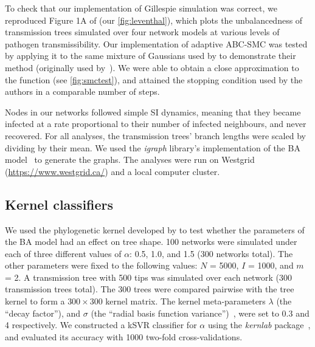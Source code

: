 \documentclass[12pt]{article}\usepackage[]{graphicx}\usepackage[]{color}
\begin{document}
To check that our implementation of Gillespie simulation was correct, we
reproduced Figure 1A of \textcite{leventhal2012inferring} (our
\cref{fig:leventhal}), which plots the unbalancedness of transmission trees
simulated over four network models at various levels of pathogen
transmissibility. Our implementation of adaptive ABC-SMC was tested by applying
it to the same mixture of Gaussians used by \citeauthor{del2012adaptive} to
demonstrate their method (originally used by~\textcite{sisson2007sequential}).
We were able to obtain a close approximation to the function (see
\cref{fig:smctest}), and attained the stopping condition used by the authors in
a comparable number of steps. 

Nodes in our networks followed simple SI dynamics, meaning that they became
infected at a rate proportional to their number of infected neighbours, and
never recovered. For all analyses, the transmission trees' branch lengths were
scaled by dividing by their mean. We used the \textit{igraph} library's
implementation of the BA model~\autocite{csardi2006igraph} to generate the
graphs. The analyses were run on Westgrid (\url{https://www.westgrid.ca/}) and
a local computer cluster.

\subsection{Kernel classifiers}
  
We used the phylogenetic kernel developed by \textcite{poon2013mapping} to test
whether the parameters of the BA model had an effect on tree shape. 100
networks were simulated under each of three different values of $\alpha$: 0.5,
1.0, and 1.5 (300 networks total). The other parameters were fixed to the
following values: $N$ = 5000, $I$ = 1000, and $m$ = 2. A transmission tree with
500 tips was simulated over each network (300 transmission trees total). The
300 trees were compared pairwise with the tree kernel to form a $300 \times
300$ kernel matrix. The kernel meta-parameters $\lambda$ (the ``decay
factor''), and $\sigma$ (the ``radial basis function
variance'')~\autocite[see][]{poon2013mapping}, were set to 0.3 and 4 respectively.
We constructed a kSVR classifier for $\alpha$ using the \textit{kernlab}
package~\autocite{zeileis2004kernlab}, and evaluated its accuracy with 1000
two-fold cross-validations.
  
\end{document}
